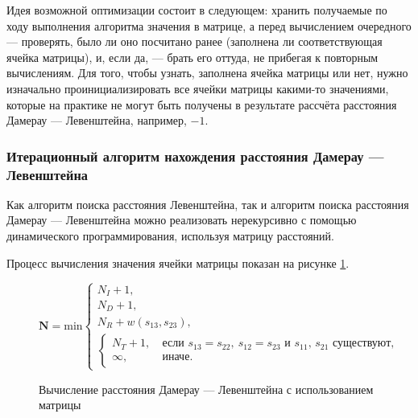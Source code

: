 Идея возможной оптимизации состоит в следующем: хранить получаемые по ходу выполнения алгоритма значения в матрице, а перед вычислением очередного --- проверять, было ли оно посчитано ранее (заполнена ли соответствующая ячейка матрицы), и, если да, --- брать его оттуда, не прибегая к повторным вычислениям.
Для того, чтобы узнать, заполнена ячейка матрицы или нет, нужно изначально проинициализировать все ячейки матрицы какими-то значениями, которые на практике не могут быть получены в результате рассчёта расстояния Дамерау --- Левенштейна, например, $-1$.

\subsubsection{Итерационный алгоритм нахождения расстояния Дамерау --- Левенштейна}

Как алгоритм поиска расстояния Левенштейна, так и алгоритм поиска расстояния Дамерау --- Левенштейна можно реализовать нерекурсивно с помощью динамического программирования, используя матрицу расстояний.

Процесс вычисления значения ячейки матрицы показан на рисунке \ref{fig:dlmat}.

\begin{figure}[H]
    \begin{center}

        \( \boldsymbol{N} =
        \mathrm{min} \begin{cases}
    N_I + 1, \\
    N_D + 1, \\
    N_R + w(s_{13}, s_{23}), \\
            \begin{cases}
                N_T + 1,\ &\text{если $s_{13} = s_{22},\ s_{12} = s_{23}$ и $s_{11}$, $s_{21}$ существуют}, \\
                \infty,\ &\text{иначе}.
            \end{cases}
\end{cases} \)
    \end{center}
    \caption{Вычисление расстояния Дамерау --- Левенштейна с использованием матрицы}
    \label{fig:dlmat}
\end{figure}

